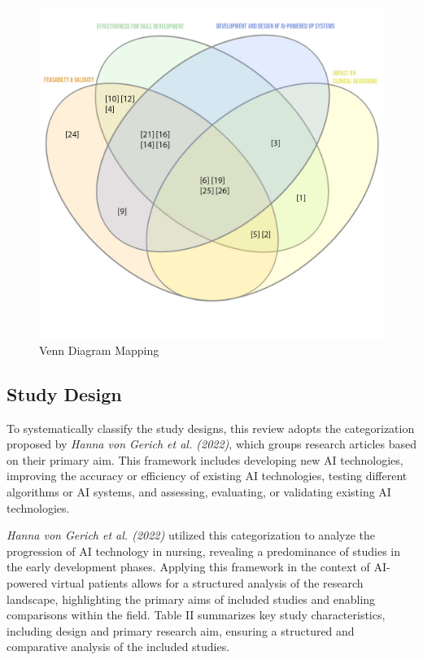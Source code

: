 \begin{figure}[ht]  %
    \centering
    \includegraphics[width=1\linewidth]{figures/Venn.jpg}
    \caption{Venn Diagram Mapping}
    \label{fig:2}
\end{figure} %

\subsection{Study Design}

To systematically classify the study designs, this review adopts the categorization proposed by \textit{Hanna von Gerich et al. (2022)}\cite{von2022}, which groups research articles based on their primary aim. This framework includes developing new AI technologies, improving the accuracy or efficiency of existing AI technologies, testing different algorithms or AI systems, and assessing, evaluating, or validating existing AI technologies.

\textit{Hanna von Gerich et al. (2022)} \cite{von2022} utilized this categorization to analyze the progression of AI technology in nursing, revealing a predominance of studies in the early development phases. Applying this framework in the context of AI-powered virtual patients allows for a structured analysis of the research landscape, highlighting the primary aims of included studies and enabling comparisons within the field.  Table II summarizes key study characteristics, including design and primary research aim, ensuring a structured and comparative analysis of the included studies.


